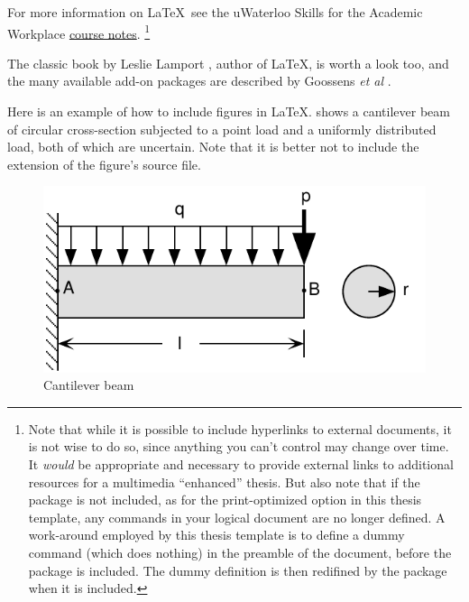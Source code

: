 For more information on \LaTeX\, see the uWaterloo Skills for the Academic Workplace  \href{https://uwaterloo.ca/information-systems-technology/services/electronic-thesis-preparation-and-submission-support/ethesis-guide/creating-pdf-version-your-thesis/creating-pdf-files-using-latex/latex-ethesis-and-large-documents}{course notes}. 
\footnote{
Note that while it is possible to include hyperlinks to external documents,
it is not wise to do so, since anything you can't control may change over time. 
It \emph{would} be appropriate and necessary to provide external links to 
additional resources for a multimedia ``enhanced'' thesis. 
But also note that if the  package is not included, 
as for the print-optimized option in this thesis template, any  
commands in your logical document are no longer defined.
A work-around employed by this thesis template is to define a dummy  
command (which does nothing) in the preamble of the document, 
before the  package is included. 
The dummy definition is then redifined by the
 package when it is included.
}

The classic book by Leslie Lamport \cite{lamport.book}, author of \LaTeX , is worth a look too, and the many available add-on packages are described by 
Goossens \textit{et al} \cite{goossens.book}.




Here is an example of how to include figures in \LaTeX. 
 shows a cantilever beam of circular cross-section
subjected to a point load and a uniformly distributed load, both of
which are uncertain. Note that it is better not to include the
extension of the figure's source file.

\begin{figure}[hbt]
  \centering
  \includegraphics[clip=true]{figures/Inkscape/beam}
  \caption{Cantilever beam}
\label{fig:beam}
\end{figure}



